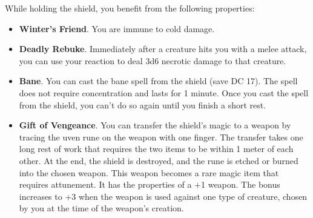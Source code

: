         While holding the shield, you benefit from the following properties:
        \begin{itemize}
            \item \textbf{Winter's Friend}.
            You are immune to cold damage.
            \item \textbf{Deadly Rebuke}.
            Immediately after a creature hits you with a melee attack, you can use your reaction to deal 3d6 necrotic damage to that creature.
            \item \textbf{Bane}.
            You can cast the bane spell from the shield (save DC 17).
            The spell does not require concentration and lasts for 1 minute.
            Once you cast the spell from the shield, you can't do so again until you finish a short rest.
            \item \textbf{Gift of Vengeance}.
            You can transfer the shield's magic to a weapon by tracing the uven rune on the weapon with one finger.
            The transfer takes one long rest of work that requires the two items to be within 1 meter of each other.
            At the end, the shield is destroyed, and the rune is etched or burned into the chosen weapon.
            This weapon becomes a rare magic item that requires attunement.
            It has the properties of a +1 weapon.
            The bonus increases to +3 when the weapon is used against one type of creature, chosen by you at the time of the weapon's creation.
        \end{itemize}
\newpage~\newpage
